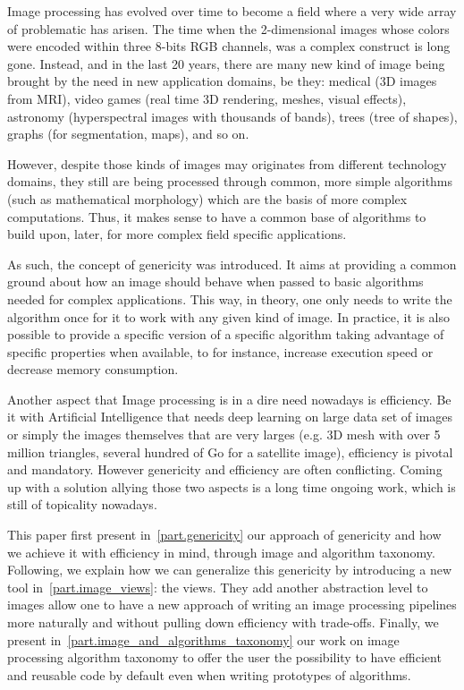 \vspace{1cm}


Image processing has evolved over time to become a field where a very wide array of problematic has arisen. The time
when the 2-dimensional images whose colors were encoded within three 8-bits RGB channels, was a complex construct is
long gone. Instead, and in the last 20 years, there are many new kind of image being brought by the need in new
application domains, be they: medical (3D images from MRI), video games (real time 3D rendering, meshes, visual
effects), astronomy (hyperspectral images with thousands of bands), trees (tree of shapes), graphs (for segmentation,
maps), and so on.

However, despite those kinds of images may originates from different technology domains, they still are being processed
through common, more simple algorithms (such as mathematical morphology) which are the basis of more complex
computations. Thus, it makes sense to have a common base of algorithms to build upon, later, for more complex field
specific applications.

As such, the concept of genericity was introduced. It aims at providing a common ground about how an image should behave
when passed to basic algorithms needed for complex applications. This way, in theory, one only needs to write the
algorithm once for it to work with any given kind of image. In practice, it is also possible to provide a specific
version of a specific algorithm taking advantage of specific properties when available, to for instance, increase
execution speed or decrease memory consumption.

Another aspect that Image processing is in a dire need nowadays is efficiency. Be it with Artificial Intelligence that
needs deep learning on large data set of images or simply the images themselves that are very larges (e.g. 3D mesh with
over 5 million triangles, several hundred of Go for a satellite image), efficiency is pivotal and mandatory. However
genericity and efficiency are often conflicting. Coming up with a solution allying those two aspects is a long time
ongoing work, which is still of topicality nowadays.~\citep{geraud.2012.hdr}

This paper first present in~\ref{part.genericity} our approach of genericity and how we achieve it with efficiency in
mind, through image and algorithm taxonomy. Following, we explain how we can generalize this genericity by introducing a
new tool in~\ref{part.image_views}: the views. They add another abstraction level to images allow one to have a new
approach of writing an image processing pipelines more naturally and without pulling down efficiency with trade-offs.
Finally, we present in~\ref{part.image_and_algorithms_taxonomy} our work on image processing algorithm taxonomy to offer
the user the possibility to have efficient and reusable code by default even when writing prototypes of algorithms.

